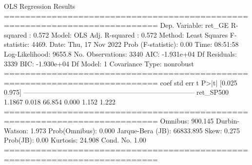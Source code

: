 \begin{ioutput}
OLS Regression Results                                
===========================================================================
Dep. Variable:                 ret_GE   R-squared :                   0.572
Model:                            OLS   Adj. R-squared :              0.572
Method:                 Least Squares   F-statistic:                  4469.
Date:                Thu, 17 Nov 2022   Prob (F-statistic):            0.00
Time:                        08:51:58   Log-Likelihood:              9655.8
No. Observations:                3340   AIC:                     -1.931e+04
Df Residuals:                    3339   BIC:                     -1.930e+04
Df Model:                           1                                                  
Covariance Type:            nonrobust                                                  
===========================================================================
coef          std err          t      P>|t|      [0.025      0.975]
---------------------------------------------------------------------------
ret_SP500      1.1867      0.018     66.854      0.000       1.152    1.222
===========================================================================
Omnibus:                      900.145   Durbin-Watson:                1.973
Prob(Omnibus):                  0.000   Jarque-Bera (JB):         66833.895
Skew:                           0.275   Prob(JB):                      0.00
Kurtosis:                      24.908   Cond. No.                      1.00
===========================================================================
\end{ioutput}

